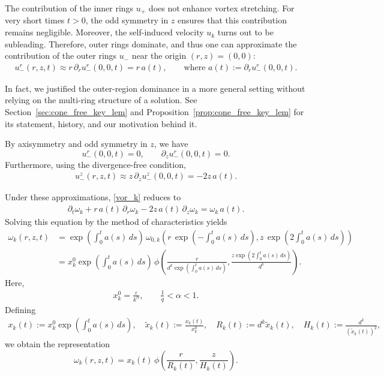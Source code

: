 \documentclass[reqno,11pt]{amsart}
\begin{document}
The contribution of the inner rings $u_+$ does not enhance vortex stretching. For very short times $t>0$, the odd symmetry in $z$ ensures that this contribution remains negligible. Moreover, the self-induced velocity $u_k$ turns out to be subleading. Therefore, outer rings dominate, and thus
one can approximate the contribution of the outer rings $u_-$ near the origin $(r,z)=(0,0)$:
\begin{align*}
    u_-^r(r,z,t) \approx r\,\partial_r u_-^r(0,0,t)=r\, a(t), 
    \qquad \text{where }a(t):= \partial_r u_-^r(0,0,t). 
\end{align*}

In fact, we justified the outer-region dominance in a more general setting without relying on the multi-ring structure of a solution. See Section~\ref{sec:cone_free_key_lem} and Proposition~\ref{prop:cone_free_key_lem} for its statement, history, and our motivation behind it.

By axisymmetry and odd symmetry in $z$, we have
\[
    u_-^r(0,0,t)=0,
    \qquad
    \partial_z u_-^r(0,0,t)=0.
\]
Furthermore, using the divergence-free condition,
\begin{align*}
    u_-^z(r,z,t)
    \approx
    z\,\partial_z u_-^z(0,0,t)
    =
    -2z\,a(t).
\end{align*}

Under these approximations, \eqref{vor_k} reduces to
\begin{align*}
    \partial_t \omega_k
    + r\,a(t)\,\partial_r \omega_k
    - 2z\,a(t)\,\partial_z \omega_k
    =
    \omega_k\,a(t).
\end{align*}
Solving this equation by the method of characteristics yields
\begin{align*}
    \omega_k(r,z,t)
    &=
    \exp\left( \int_0^t a(s) \,ds \right) 
    \,
    \omega_{0,k}
    \!\left(
        r \, \exp\left( -\int_0^t a(s) \,ds \right) ,
        z \, \exp\left( 2\int_0^t a(s) \,ds \right) 
    \right)
    \\
    &=
    x_k^0
   \exp\left( \int_0^t a(s) \,ds \right) 
   \,
    \phi\!\left(
        \frac{r}{d^k \exp\left( \int_0^t a(s) \,ds \right)  },
        \frac{z \exp\left( 2\int_0^t a(s) \,ds \right) }{d^k}
    \right).
\end{align*}
Here, 
    \begin{align*}
        x_k^0=\frac{\varepsilon}{k^\alpha}, \qquad \frac{1}{q}<\alpha<1.
    \end{align*}
Defining
\begin{align}
\label{tilde_xk_rk_hk}
    x_k(t) := x_k^0 \exp \left( {\int_0^t a(s)\,ds} \right) , 
    \quad
    \tilde x_k(t) := \frac{x_k(t)}{x_k^0},
    \quad 
    R_k(t) := d^k \tilde x_k(t),
    \quad
    H_k(t) := \frac{d^k}{(\tilde x_k(t))^2},
\end{align}
we obtain the representation
\[
    \omega_k(r,z,t)
    =
    x_k(t)\,
    \phi\!\left(
        \frac{r}{R_k(t)},
        \frac{z}{H_k(t)}
    \right).
\]
\end{document}
